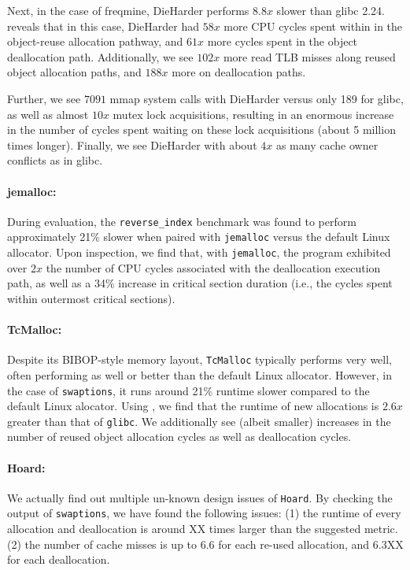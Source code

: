 Next, in the case of freqmine, DieHarder performs $8.8x$ slower than glibc 2.24. \MP{} reveals that in this case, DieHarder had $58x$ more CPU cycles spent within in the object-reuse allocation pathway, and $61x$ more cycles spent in the object deallocation path.
	Additionally, we see $102x$ more read TLB misses along reused object allocation paths, and $188x$ more on deallocation paths.
	
	Further, we see $7091$ mmap system calls with DieHarder versus only 189 for glibc, as well as almost $10x$ mutex lock acquisitions, resulting in an enormous increase in the number of cycles spent waiting on these lock acquisitions (about 5 million times longer).
	Finally, we see DieHarder with about $4x$ as many cache owner conflicts as in glibc.

\paragraph{jemalloc:}
During evaluation, the \texttt{reverse\_index} benchmark was found to perform approximately 21\% slower when paired with \texttt{jemalloc} versus the default Linux allocator. Upon inspection, we find that, with \texttt{jemalloc}, the program exhibited over $2x$ the number of CPU cycles associated with the deallocation execution path, as well as a 34\% increase in critical section duration (i.e., the cycles spent within outermost critical sections).

\paragraph{TcMalloc:}
Despite its BIBOP-style memory layout, \texttt{TcMalloc} typically performs very well, often performing as well or better than the default Linux allocator. However, in the case of \texttt{swaptions}, it runs around 21\% runtime slower compared to the default Linux alocator. Using \MP{}, we find that the runtime of new allocations  is $2.6x$ greater than that of \texttt{glibc}. We additionally see (albeit smaller) increases in the number of reused object allocation cycles as well as deallocation cycles.


\paragraph{Hoard:} 
We actually find out multiple un-known design issues of \texttt{Hoard}. By checking the output of \texttt{swaptions}, we have found the following issues: (1) the runtime of every allocation and deallocation is around XX times larger than the suggested metric. (2) the number of cache misses  is up to 6.6 for each re-used allocation, and 6.3XX for each deallocation. 